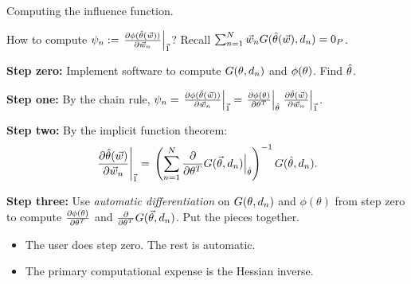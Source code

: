 \begin{frame}{Computing the influence function.}

How to compute
$\psi_n := \left.\frac{\partial \phi(\hat{\theta}(\vec{w}))}{\partial \vec{w}_n}\right|_{\vec{1}}$?
%
Recall $\sum_{n=1}^N \vec{w}_{n} G(\hat{\theta}(\vec{w}), d_{n}) =  0_{P}$.

\textbf{Step zero:}
Implement software to compute $G(\theta, d_{n})$ and
$\phi(\theta)$. Find $\hat{\theta}$.

\textbf{Step one:}
By the chain rule,
$\psi_n = \left.\frac{\partial \phi(\hat{\theta}(\vec{w}))}{\partial \vec{w}_n}\right|_{\vec{1}}
= \left.\frac{\partial \phi(\theta)}{\partial \theta^T}\right|_{\hat{\theta}}
  \left.\frac{\partial \hat{\theta}(\vec{w})}{\partial \vec{w}_n}\right|_{\vec{1}}$.

\textbf{Step two:}
By the implicit function theorem:
%
\begin{align*}
%
\fracat{\partial \thetahat(\w)}{\partial \w_n}{\onevec} ={}
\left(
  \sumn \frac{\partial}{\partial \theta^T} G(\vec\theta, \d_{n}) \Big\vert_{\thetahat}
\right)^{-1} G(\thetahat, \d_{n}).
%
\end{align*}
%

\textbf{Step three:}
%
Use \textit{automatic differentiation} on $G(\theta, d_{n})$ and $\phi(\theta)$
from step zero to compute $\frac{\partial \phi(\theta)}{\partial \theta^T}$
and $\frac{\partial}{\partial \theta^T} G(\vec\theta, d_{n})$. Put the pieces
together.

\hrulefill

\begin{itemize}
    \item The user does step zero.  The rest is automatic.
    \item The primary computational expense is the Hessian inverse.
\end{itemize}



%
%


\end{frame}
